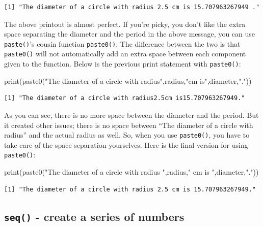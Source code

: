 \documentclass[
  letterpaper,
]{book}
\newenvironment{Shaded}{\begin{snugshade}}{\end{snugshade}}
\newcommand{\FunctionTok}[1]{\textcolor[rgb]{0.28,0.35,0.67}{#1}}
\newcommand{\NormalTok}[1]{\textcolor[rgb]{0.00,0.23,0.31}{#1}}
\newcommand{\StringTok}[1]{\textcolor[rgb]{0.13,0.47,0.30}{#1}}
\begin{document}
\begin{verbatim}
[1] "The diameter of a circle with radius 2.5 cm is 15.707963267949 ."
\end{verbatim}

The above printout is almost perfect. If you're picky, you don't like
the extra space separating the diameter and the period in the above
message, you can use \texttt{paste()}'s cousin function
\texttt{paste0()}. The difference between the two is that
\texttt{paste0()} will not automatically add an extra space between each
component given to the function. Below is the previous print statement
with \texttt{paste0()}:

\begin{Shaded}
\begin{Highlighting}[]
\FunctionTok{print}\NormalTok{(}\FunctionTok{paste0}\NormalTok{(}\StringTok{"The diameter of a circle with radius"}\NormalTok{,radius,}\StringTok{"cm is"}\NormalTok{,diameter,}\StringTok{"."}\NormalTok{))}
\end{Highlighting}
\end{Shaded}

\begin{verbatim}
[1] "The diameter of a circle with radius2.5cm is15.707963267949."
\end{verbatim}

As you can see, there is no more space between the diameter and the
period. But it created other issues; there is no space between ``The
diameter of a circle with radius'' and the actual radius as well. So,
when you use \texttt{paste0()}, you have to take care of the space
separation yourselves. Here is the final version for using
\texttt{paste0()}:

\begin{Shaded}
\begin{Highlighting}[]
\FunctionTok{print}\NormalTok{(}\FunctionTok{paste0}\NormalTok{(}\StringTok{"The diameter of a circle with radius "}\NormalTok{,radius,}\StringTok{" cm is "}\NormalTok{,diameter,}\StringTok{"."}\NormalTok{))}
\end{Highlighting}
\end{Shaded}

\begin{verbatim}
[1] "The diameter of a circle with radius 2.5 cm is 15.707963267949."
\end{verbatim}

\subsection*{\texorpdfstring{\texttt{seq()} - create a series of
numbers}{seq() - create a series of numbers}}\label{seq-function}
\end{document}
